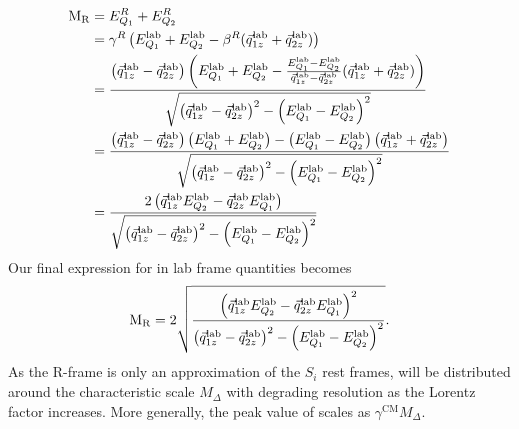 \begin{align}
  \mathrm{M_R} &= E_{Q_1}^R + E_{Q_2}^R \\
      &= \gamma^R \left( E_{Q_1}^{\textrm{lab}} + E_{Q_2}^{\textrm{lab}} - \beta^R (
\vec{q}_{1z}^{\textrm{lab}} + \vec{q}_{2z}^{\textrm{lab}}) \right) \\
      &= \frac{\left( \vec{q}_{1z}^{\textrm{lab}} - \vec{q}_{2z}^{\textrm{lab}}\right) 
               \left( E_{Q_1}^{\textrm{lab}} + E_{Q_2}^{\textrm{lab}} - \frac{E_{Q_1}^{\textrm{lab}}
- E_{Q_2}^{\textrm{lab}}}{\vec{q}_{1z}^{\textrm{lab}} - \vec{q}_{2z}^{\textrm{lab}}}
(\vec{q}_{1z}^{\textrm{lab}} + \vec{q}_{2z}^{\textrm{lab}}) \right)}
              { \sqrt{ \left( \vec{q}_{1z}^{\textrm{lab}} - \vec{q}_{2z}^{\textrm{lab}} \right)^2 
                      -\left( E_{Q_1}^{\textrm{lab}} - E_{Q_2}^{\textrm{lab}}\right)^2 }} \\
      &= \frac{\left( \vec{q}_{1z}^{\textrm{lab}} - \vec{q}_{2z}^{\textrm{lab}} \right) 
               \left( E_{Q_1}^{\textrm{lab}} + E_{Q_2}^{\textrm{lab}} \right) 
               - 
               \left( E_{Q_1}^{\textrm{lab}} - E_{Q_2}^{\textrm{lab}} \right)
               \left( \vec{q}_{1z}^{\textrm{lab}} + \vec{q}_{2z}^{\textrm{lab}} \right) }
              { \sqrt{ \left( \vec{q}_{1z}^{\textrm{lab}} - \vec{q}_{2z}^{\textrm{lab}} \right)^2 
                      -\left( E_{Q_1}^{\textrm{lab}} - E_{Q_2}^{\textrm{lab}}\right)^2 }} \\
      &= \frac{2 \left( \vec{q}_{1z}^{\textrm{lab}} E_{Q_2}^{\textrm{lab}} 
                       - \vec{q}_{2z}^{\textrm{lab}} E_{Q_1}^{\textrm{lab}} \right)}
              { \sqrt{ \left( \vec{q}_{1z}^{\textrm{lab}} - \vec{q}_{2z}^{\textrm{lab}} \right)^2 
                      -\left( E_{Q_1}^{\textrm{lab}} - E_{Q_2}^{\textrm{lab}}\right)^2 }}
\end{align}
Our final expression for \mr in lab frame quantities becomes
\begin{equation}
  \mathrm{M_R} = 2 \sqrt { \frac{ \left( \vec{q}_{1z}^{\textrm{lab}} E_{Q_2}^{\textrm{lab}} 
                       - \vec{q}_{2z}^{\textrm{lab}} E_{Q_1}^{\textrm{lab}} \right) ^2}
                       { \left( \vec{q}_{1z}^{\textrm{lab}} - \vec{q}_{2z}^{\textrm{lab}}
\right)^2 
                        -\left( E_{Q_1}^{\textrm{lab}} - E_{Q_2}^{\textrm{lab}}\right)^2 }} . 
\end{equation}
As the R-frame is only an approximation of the $S_i$ rest frames, \mr will be distributed around
the characteristic scale $M_\Delta$ with degrading resolution as the Lorentz factor increases. 
More generally, the peak value of \mr scales as $\gamma^{\textrm{CM}}M_\Delta$.

